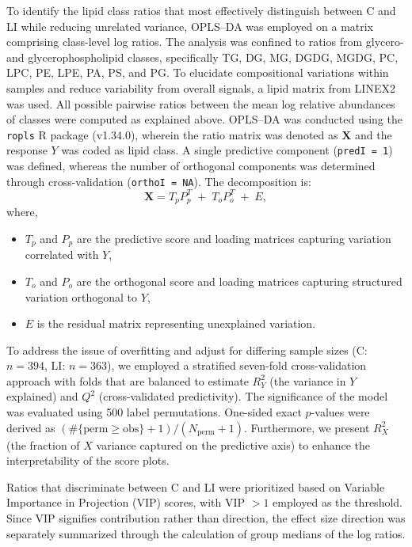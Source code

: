 \documentclass[10pt,letterpaper]{article}
\begin{document}
To identify the lipid class ratios that most effectively distinguish between C and LI while reducing unrelated variance, OPLS–DA was employed on a matrix comprising class-level log ratios. The analysis was confined to ratios from glycero- and glycerophospholipid classes, specifically TG, DG, MG, DGDG, MGDG, PC, LPC, PE, LPE, PA, PS, and PG. To elucidate compositional variations within samples and reduce variability from overall signals, a lipid matrix from LINEX2 was used. All possible pairwise ratios between the mean log relative abundances of classes were computed as explained above. OPLS–DA was conducted using the \texttt{ropls} R package (v1.34.0), wherein the ratio matrix was denoted as $\mathbf{X}$ and the response $Y$ was coded as lipid class. A single predictive component (\texttt{predI = 1}) was defined, whereas the number of orthogonal components was determined through cross-validation (\texttt{orthoI = NA}). The decomposition is:
\[
  \mathbf{X} = T_{p} P_{p}^{T} \;+\; T_{o} P_{o}^{T} \;+\; E,
\]
where,
\begin{itemize}
  \item \(T_{p}\) and \(P_{p}\) are the predictive score and loading matrices capturing variation correlated with \(Y\),
  \item \(T_{o}\) and \(P_{o}\) are the orthogonal score and loading matrices capturing structured variation orthogonal to \(Y\),
  \item \(E\) is the residual matrix representing unexplained variation.
\end{itemize}

To address the issue of overfitting and adjust for differing sample sizes (C: $n=394$, LI: $n=363$), we employed a stratified seven-fold cross-validation approach with folds that are balanced to estimate $R^{2}_{Y}$ (the variance in $Y$ explained) and $Q^{2}$ (cross-validated predictivity). The significance of the model was evaluated using 500 label permutations. One-sided exact $p$-values were derived as $(\#\{\text{perm} \geq \text{obs}\} + 1)/(N_{\text{perm}} + 1)$. Furthermore, we present $R^{2}_{X}$ (the fraction of $X$ variance captured on the predictive axis) to enhance the interpretability of the score plots.

Ratios that discriminate between C and LI were prioritized based on Variable Importance in Projection (VIP) scores, with VIP $> 1$ employed as the threshold. Since VIP signifies contribution rather than direction, the effect size direction was separately summarized through the calculation of group medians of the log ratios. 
\end{document}
